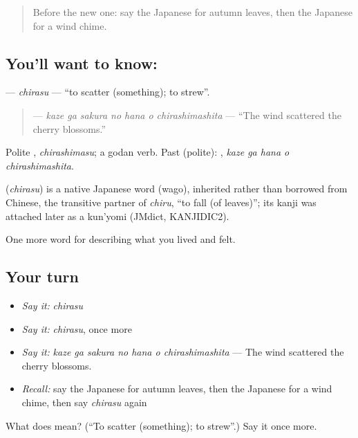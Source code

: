 \label{lesson:JA-C501-chirasu}



\begin{quote}
Before the new one: say the Japanese for autumn leaves, then the Japanese for a wind chime.
\end{quote}

\subsection*{You'll want to know: }
\textbf{} — \emph{chirasu} — \textquotedblleft{}to scatter (something); to strew\textquotedblright{}.

\begin{quote}
\textbf{   } — \emph{kaze ga sakura no hana o chirashimashita} — \textquotedblleft{}The wind scattered the cherry blossoms.\textquotedblright{}
\end{quote}

Polite \textbf{}, \emph{chirashimasu}; a godan verb. Past (polite): \textbf{  }, \emph{kaze ga hana o chirashimashita}.

\begin{cousinweb}
\textbf{} (\emph{chirasu}) is a native Japanese word (wago), inherited rather than borrowed from Chinese, the transitive partner of \emph{chiru}, \textquotedblleft{}to fall (of leaves)\textquotedblright{}; its kanji was attached later as a kun'yomi (JMdict, KANJIDIC2).
\end{cousinweb}

\begin{grammarlens}[title={What you've built}]
One more word for describing what you lived and felt.
\end{grammarlens}

\subsection*{Your turn}
\begin{itemize}
\raggedright
  \item \emph{Say it:} \emph{chirasu}
  \item \emph{Say it:} \emph{chirasu}, once more
  \item \emph{Say it:} \emph{kaze ga sakura no hana o chirashimashita} — The wind scattered the cherry blossoms.
  \item \emph{Recall:} say the Japanese for autumn leaves, then the Japanese for a wind chime, then say \emph{chirasu} again
\end{itemize}

\begin{tcolorbox}[breakable,colback=teal!4,colframe=teal!35!black,title={Before you move on}]
What does  mean? (\textquotedblleft{}To scatter (something); to strew\textquotedblright{}.) Say it once more.
\end{tcolorbox}
